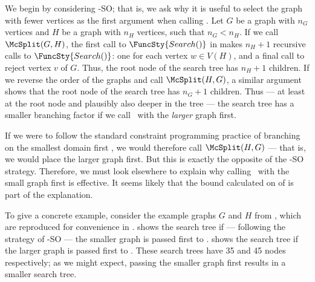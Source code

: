 We begin by considering \McSplit-SO; that is, we
ask why it is useful to select the graph with fewer vertices as the first argument
when calling \McSplit.  Let $G$
be a graph with $n_G$ vertices and $H$ be a graph with $n_H$ vertices, such that $n_G < n_H$.
If we call $\McSplit(G,H)$, the first call to $\FuncSty{Search()}$ in 
makes $n_H + 1$ recursive calls to $\FuncSty{Search()}$: one for each vertex $w \in V(H)$,
and a final call to reject vertex $v$ of $G$.  Thus, the root node of the search tree
has $n_H + 1$ children. If we reverse the order of the graphs and
call $\McSplit(H,G)$, a similar argument shows that the root node of the search tree
has $n_G + 1$ children.  Thus --- at least at the root node and plausibly also deeper in the
tree --- the search tree has a smaller branching factor if we call \McSplit\ with the
\emph{larger} graph first.

If we were to follow the standard constraint programming practice of branching
on the smallest domain first \cite{DBLP:journals/ai/HaralickE80}, we would 
therefore call $\McSplit(H,G)$ --- that is, we would place the larger graph first.
But this is exactly the opposite of the \McSplit-SO strategy.
Therefore, we must look elsewhere to explain why calling \McSplit\ with the small
graph first is effective.  It seems likely that the bound calculated on 
of  is part of the explanation.

To give a concrete example, consider the example graphs $G$ and $H$ from
, which are reproduced for convenience in .
 shows the search tree if --- following the
strategy of \McSplit-SO --- the smaller graph is passed first to \McSplit.
 shows the search tree if the larger graph
is passed first to \McSplit.  These search trees have 35 and 45 nodes respectively;
as we might expect, passing the smaller graph first results in a smaller search tree.

